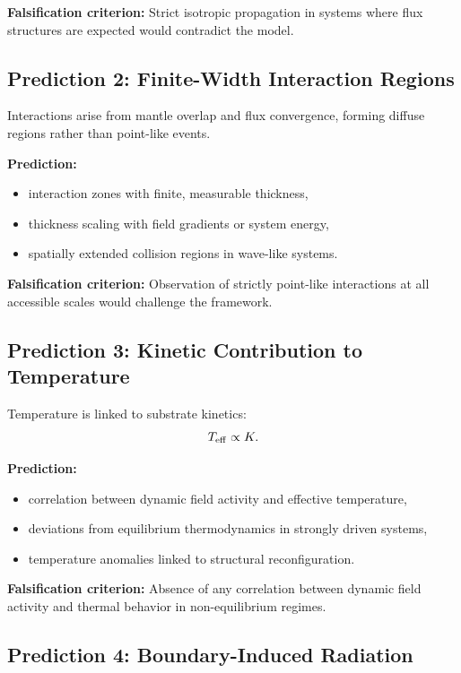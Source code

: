 \documentclass[11pt]{article}
\begin{document}
\textbf{Falsification criterion:}  
Strict isotropic propagation in systems where flux structures are expected would contradict the model.

\subsection{Prediction 2: Finite-Width Interaction Regions}

Interactions arise from mantle overlap and flux convergence, forming diffuse regions rather than point-like events.

\textbf{Prediction:}
\begin{itemize}
\item interaction zones with finite, measurable thickness,
\item thickness scaling with field gradients or system energy,
\item spatially extended collision regions in wave-like systems.
\end{itemize}

\textbf{Falsification criterion:}  
Observation of strictly point-like interactions at all accessible scales would challenge the framework.

\subsection{Prediction 3: Kinetic Contribution to Temperature}

Temperature is linked to substrate kinetics:
\begin{equation}
T_{\rm eff} \propto K.
\end{equation}

\textbf{Prediction:}
\begin{itemize}
\item correlation between dynamic field activity and effective temperature,
\item deviations from equilibrium thermodynamics in strongly driven systems,
\item temperature anomalies linked to structural reconfiguration.
\end{itemize}

\textbf{Falsification criterion:}  
Absence of any correlation between dynamic field activity and thermal behavior in non-equilibrium regimes.

\subsection{Prediction 4: Boundary-Induced Radiation}
\end{document}
